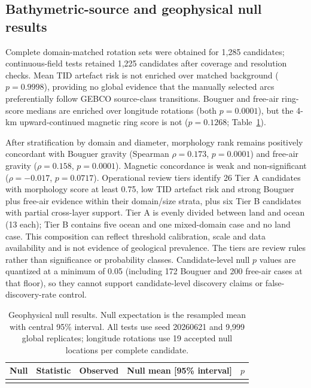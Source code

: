 \documentclass[11pt]{article}
\begin{document}
\subsection{Bathymetric-source and geophysical null results}
Complete domain-matched rotation sets were obtained for 1,285 candidates; continuous-field tests retained 1,225 candidates after coverage and resolution checks. Mean TID artefact risk is not enriched over matched background ($p=0.9998$), providing no global evidence that the manually selected arcs preferentially follow GEBCO source-class transitions. Bouguer and free-air ring-score medians are enriched over longitude rotations (both $p=0.0001$), but the 4-km upward-continued magnetic ring score is not ($p=0.1268$; Table~\ref{tab:geophysical}).

After stratification by domain and diameter, morphology rank remains positively concordant with Bouguer gravity (Spearman $\rho=0.173$, $p=0.0001$) and free-air gravity ($\rho=0.158$, $p=0.0001$). Magnetic concordance is weak and non-significant ($\rho=-0.017$, $p=0.0717$). Operational review tiers identify 26 Tier A candidates with morphology score at least 0.75, low TID artefact risk and strong Bouguer plus free-air evidence within their domain/size strata, plus six Tier B candidates with partial cross-layer support. Tier A is evenly divided between land and ocean (13 each); Tier B contains five ocean and one mixed-domain case and no land case. This composition can reflect threshold calibration, scale and data availability and is not evidence of geological prevalence. The tiers are review rules rather than significance or probability classes. Candidate-level null $p$ values are quantized at a minimum of 0.05 (including 172 Bouguer and 200 free-air cases at that floor), so they cannot support candidate-level discovery claims or false-discovery-rate control.

\begin{table}[H]
\centering
\caption{Geophysical null results. Null expectation is the resampled mean with central 95\% interval. All tests use seed 20260621 and 9,999 global replicates; longitude rotations use 19 accepted null locations per complete candidate.}
\label{tab:geophysical}
\scriptsize
\begin{tabular}{@{}p{}p{}r>{\raggedright\arraybackslash}p{}r@{}}
\toprule
Null & Statistic & Observed & Null mean [95\% interval] & $p$\\
\midrule
\\
\bottomrule
\end{tabular}
\end{table}
\end{document}

